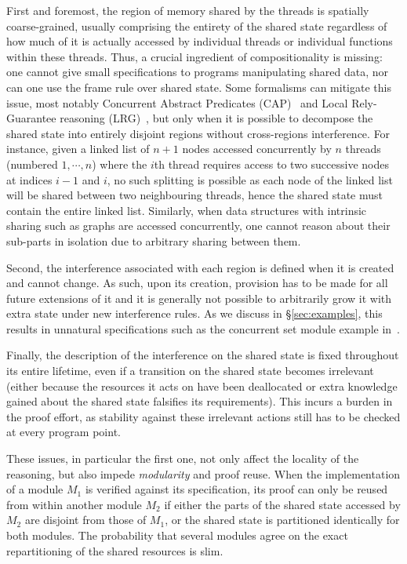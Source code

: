 First and foremost, the region of memory shared by the threads is
spatially coarse-grained, usually comprising the entirety of the
shared state regardless of how much of it is actually accessed by
individual threads or individual functions within these threads. Thus,
a crucial ingredient of compositionality is missing: one cannot give
small specifications to programs manipulating shared data, nor can one
use the frame rule over shared state. Some formalisms can mitigate
this issue, most notably Concurrent Abstract Predicates
(CAP)~\cite{cap-ecoop10} and Local Rely-Guarantee reasoning
(LRG)~\cite{lrg}, but only when it is possible to decompose the shared
state into entirely disjoint regions without cross-regions
interference. For instance, given a linked list of $n+1$ nodes
accessed concurrently by $n$ threads (numbered $1, \cdots, n$) where
the $i$th thread requires access to two successive nodes at indices
$i-1$ and $i$, no such splitting is possible as each node of the
linked list will be shared between two neighbouring threads, hence the
shared state must contain the entire linked list. Similarly, when data
structures with intrinsic sharing such as graphs are accessed
concurrently, one cannot reason about their sub-parts in isolation due
to arbitrary sharing between them.

Second, the interference associated with each region is defined when it is created and cannot change. As such, upon its creation, provision has to be made for
all future extensions of it and it is generally not possible to
arbitrarily grow it with extra state under new interference rules.
As we discuss in \S\ref{sec:examples}, this results in unnatural specifications such as the concurrent set module example in~\cite{cap-ecoop10}. 

Finally, the description of the interference on the shared state is
fixed throughout its entire lifetime, even if a transition on the shared state 
becomes irrelevant (either because the resources it acts on have been
deallocated or extra knowledge gained about the shared state
falsifies its requirements). This incurs
a burden in the proof effort, as stability against these irrelevant
actions still has to be checked at every program point.

These issues, in particular the first one, not only affect the
locality of the reasoning, but also impede \emph{modularity} and proof
reuse. When the implementation of a module $M_1$ is verified against
its specification, its proof can only be reused from within another
module $M_2$ if either the parts of the shared state accessed by $M_2$
are disjoint from those of $M_1$, or the shared state is partitioned
identically for both modules. The probability that several modules
agree on the exact repartitioning of the shared resources is slim.

